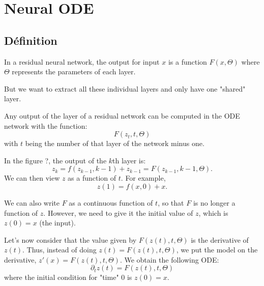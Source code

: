 \documentclass[10pt,a4paper]{article}
\theoremstyle{definition}
\theoremstyle{definition}
\begin{document}
\section{Neural ODE}

\subsection{Définition}





In a residual neural network, the output for input $x$ is a function $F(x, \Theta)$ where $\Theta$ represents the parameters of each layer. 

But we want to extract all these individual layers and only have one "shared" layer.


Any output of the layer of a residual network can be computed in the ODE network with the function:
$$F(z_t, t, \Theta)$$
with $t$ being the number of that layer of the network minus one.

In the figure ?, the output of the $k$th layer is:
$$z_k = f(z_{k-1}, k-1) + z_{k-1} = F(z_{k-1}, k-1, \Theta).$$
We can then view $z$ as a function of $t$. For example,
$$z(1) = f(x, 0) + x.$$

We can also write $F$ as a continuous function of $t$, so that $F$ is no longer a function of $z$. However, we need to give it the initial value of $z$, which is $z(0) = x$ (the input).

Let's now consider that the value given by $F(z(t), t, \Theta)$ is the derivative of $z(t)$. Thus, instead of doing $z(t) = F(z(t), t, \Theta)$, we put the model on the derivative, $z'(x) = F(z(t), t, \Theta)$.  We obtain the following ODE:
$$ \partial_t z(t) = F(z(t), t, \Theta) $$
where the initial condition for "time" $0$ is $z(0) = x$. 
\end{document}
